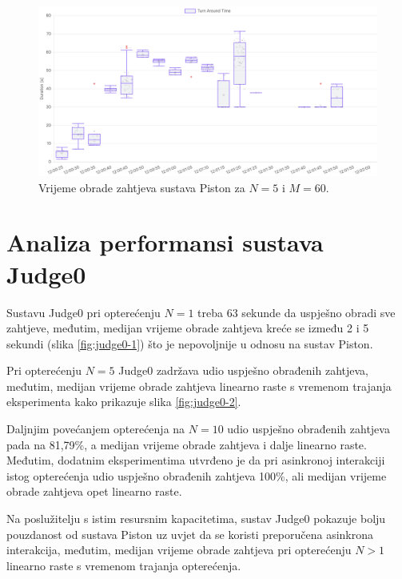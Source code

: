 \documentclass[times, utf8, diplomski]{fer}
\begin{document}
\begin{figure}[htb]
	\centering
	\includegraphics[width=\textwidth]{images/Piston TAT for 5 5s.png}
	\caption{
		Vrijeme obrade zahtjeva sustava Piston za $N=5$ i $M=60$.
	}
	\label{fig:piston-2}
\end{figure}

\pagebreak

\section{Analiza performansi sustava Judge0}
Sustavu Judge0 pri opterećenju $N=1$ treba 63 sekunde da uspješno obradi sve zahtjeve, međutim, medijan vrijeme obrade zahtjeva kreće se između 2 i 5 sekundi (slika \ref{fig:judge0-1}) što je nepovoljnije u odnosu na sustav Piston. 

Pri opterećenju $N=5$ Judge0 zadržava udio uspješno obrađenih zahtjeva, međutim, medijan vrijeme obrade zahtjeva linearno raste s vremenom trajanja eksperimenta kako prikazuje slika \ref{fig:judge0-2}.

Daljnjim povećanjem opterećenja na $N=10$ udio uspješno obrađenih zahtjeva pada na 81,79\%, a medijan vrijeme obrade zahtjeva i dalje linearno raste. Međutim, dodatnim eksperimentima utvrđeno je da pri asinkronoj interakciji istog opterećenja udio uspješno obrađenih zahtjeva 100\%, ali medijan vrijeme obrade zahtjeva opet linearno raste.

Na poslužitelju s istim resursnim kapacitetima, sustav Judge0 pokazuje bolju pouzdanost od sustava Piston uz uvjet da se koristi preporučena asinkrona interakcija, međutim, medijan vrijeme obrade zahtjeva pri opterećenju $N>1$ linearno raste s vremenom trajanja opterećenja.
\end{document}
